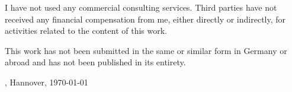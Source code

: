 I have not used any commercial consulting services. Third parties have not received any financial compensation from me, either directly or indirectly, for activities related to the content of this work.

This work has not been submitted in the same or similar form in Germany or abroad and has not been published in its entirety.

\vspace*{15mm}
\name, Hannover, \today

\clearpage
